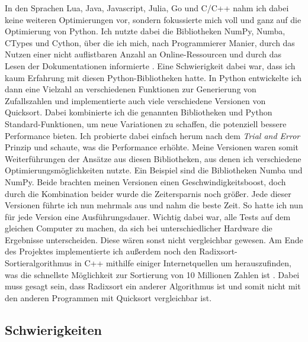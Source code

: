 \documentclass[11pt,a4paper]{article}
\begin{document}
In den Sprachen Lua, Java, Javascript, Julia, Go und C/C++ nahm ich dabei keine weiteren Optimierungen vor,
sondern fokussierte mich voll und ganz auf die Optimierung von Python.
Ich nutzte dabei die Bibliotheken NumPy, Numba, CTypes und Cython, über die ich mich, nach Programmierer
Manier, durch das Nutzen einer nicht auflistbaren Anzahl an Online-Ressourcen und
durch das Lesen der Dokumentationen informierte \cite{cythondocs} \cite{cythondocsnumpy} \cite{cythonctypes}.
Eine Schwierigkeit dabei war, dass ich kaum Erfahrung mit diesen Python-Bibliotheken hatte.
In Python entwickelte ich dann eine Vielzahl an verschiedenen Funktionen zur Generierung von Zufallszahlen
und implementierte auch viele verschiedene Versionen von Quicksort. Dabei kombinierte ich die
genannten Bibliotheken und Python Standard-Funktionen, um neue Variationen zu schaffen,
die potenziell bessere Performance bieten.
Ich probierte dabei einfach herum nach dem \textit{Trial and Error} Prinzip und schaute, was
die Performance erhöhte.
Meine Versionen waren somit Weiterführungen der Ansätze aus diesen Bibliotheken, aus denen ich
verschiedene Optimierungsmöglichkeiten nutzte.
Ein Beispiel sind die Bibliotheken Numba und NumPy. Beide brachten meinen Versionen einen
Geschwindigkeitsboost, doch durch die Kombination beider wurde die Zeitersparnis noch größer.
Jede dieser Versionen führte ich nun mehrmals aus und nahm die beste Zeit.
So hatte ich nun für jede Version eine Ausführungsdauer.
Wichtig dabei war, alle Tests auf dem gleichen Computer zu machen,
da sich bei unterschiedlicher Hardware
die Ergebnisse unterscheiden. Diese wären sonst nicht vergleichbar gewesen.
Am Ende des Projektes implementierte ich außerdem noch den Radixsort-Sortieralgorithmus in C++ mithilfe
einiger Internetquellen um herauszufinden, was die schnellste Möglichkeit zur Sortierung von 10 Millionen
Zahlen ist \cite{terdiman} \cite{michael} \cite{intelavxdocs} \cite{avxguide}.
Dabei muss gesagt sein, dass Radixsort ein anderer
Algorithmus ist und somit nicht mit den anderen Programmen mit Quicksort vergleichbar ist.

\subsection{Schwierigkeiten}
\end{document}
